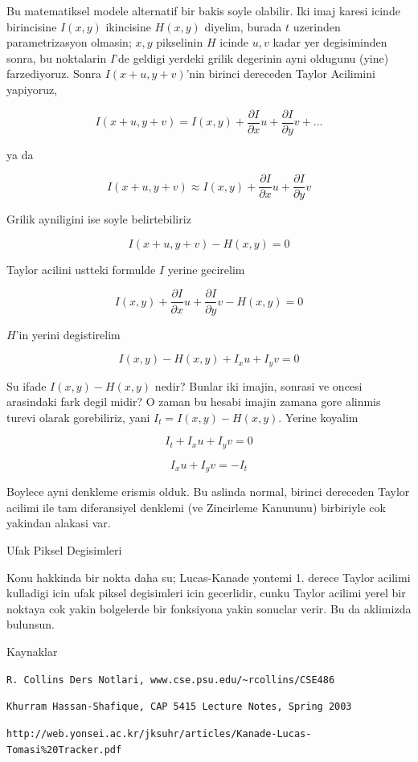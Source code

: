 \documentclass[12pt,fleqn]{article}\usepackage{../common}
\begin{document}
Bu matematiksel modele alternatif bir bakis soyle olabilir. Iki imaj karesi
icinde birincisine $I(x,y)$ ikincisine $H(x,y)$ diyelim, burada $t$
uzerinden parametrizasyon olmasin; $x,y$ pikselinin $H$ icinde $u,v$ kadar
yer degisiminden sonra, bu noktalarin $I$'de geldigi yerdeki grilik degerinin
ayni oldugunu (yine) farzediyoruz. Sonra $I(x+u,y+v)$'nin birinci
dereceden Taylor Acilimini yapiyoruz, 

$$ I(x+u,y+v) = I(x,y) + \frac{\partial I}{\partial x}u + 
\frac{\partial I}{\partial y}v + ...
$$

ya da

$$ I(x+u,y+v) \approx I(x,y) + \frac{\partial I}{\partial x}u + 
\frac{\partial I}{\partial y}v 
$$

Grilik ayniligini ise soyle belirtebiliriz

$$  I(x+u,y+v) - H(x,y) = 0$$

Taylor acilini ustteki formulde $I$ yerine gecirelim

$$ I(x,y) + 
\frac{\partial I}{\partial x}u + 
\frac{\partial I}{\partial y}v - H(x,y) = 0
$$

$H$'in yerini degistirelim

$$ I(x,y)  - H(x,y) + I_xu + I_yv = 0$$

Su ifade $I(x,y) - H(x,y)$ nedir? Bunlar iki imajin, sonrasi ve oncesi
arasindaki fark degil midir?  O zaman bu hesabi imajin zamana gore alinmis
turevi olarak gorebiliriz, yani $I_t = I(x,y) - H(x,y)$. Yerine koyalim

$$ I_t + I_xu + I_yv = 0$$

$$ I_xu + I_yv = -I_t $$

Boylece ayni denkleme erismis olduk. Bu aslinda normal, birinci
dereceden Taylor acilimi ile tam diferansiyel denklemi (ve Zincirleme
Kanununu) birbiriyle cok yakindan alakasi var. 

Ufak Piksel Degisimleri

Konu hakkinda bir nokta daha su; Lucas-Kanade yontemi 1. derece Taylor
acilimi kulladigi icin ufak piksel degisimleri icin gecerlidir, cunku
Taylor acilimi yerel bir noktaya cok yakin bolgelerde bir fonksiyona
yakin sonuclar verir. Bu da aklimizda bulunsun.

Kaynaklar

\verb!R. Collins Ders Notlari, www.cse.psu.edu/~rcollins/CSE486!

\verb!Khurram Hassan-Shafique, CAP 5415 Lecture Notes, Spring 2003!

\verb!http://web.yonsei.ac.kr/jksuhr/articles/Kanade-Lucas-Tomasi%20Tracker.pdf!
\end{document}
